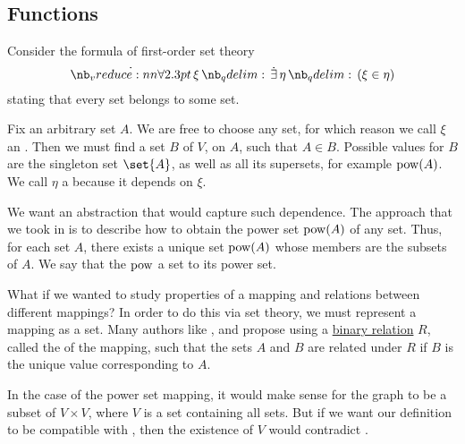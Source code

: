 \subsection{Functions}\label{subsec:functions}

\begin{remark}\label{rem:function_definition}
  Consider the formula of first-order set theory
  \begin{equation}\label{eq:rem:function_definition}
    \qforall \xi \qexists \eta (\xi \in \eta)
  \end{equation}
  stating that every set belongs to some set.

  Fix an arbitrary set \( A \). We are free to choose any set, for which reason we call \( \xi \) an . Then we must find a set \( B \) of \( V \),  on \( A \), such that \( A \in B \). Possible values for \( B \) are the singleton set \( \set{ A } \), as well as all its supersets, for example \( \operatorname{pow}(A) \). We call \( \eta \) a  because it depends on \( \xi \).

  We want an abstraction that would capture such dependence. The approach that we took in  is to describe how to obtain the power set \( \operatorname{pow}(A) \) of any set. Thus, for each set \( A \), there exists a unique set \( \operatorname{pow}(A) \) whose members are the subsets of \( A \). We say that the  \( \operatorname{pow} \)  a set to its power set.

  What if we wanted to study properties of a mapping and relations between different mappings? In order to do this via set theory, we must represent a mapping as a set. Many authors like ,  and  propose using a \hyperref[def:binary_relation]{binary relation} \( R \), called the  of the mapping, such that the sets \( A \) and \( B \) are related under \( R \) if \( B \) is the unique value corresponding to \( A \).

  In the case of the power set mapping, it would make sense for the graph to be a subset of \( V \times V \), where \( V \) is a set containing all sets. But if we want our definition to be compatible with \hyperref[def:zfc]{}, then the existence of \( V \) would contradict .


\end{remark}
